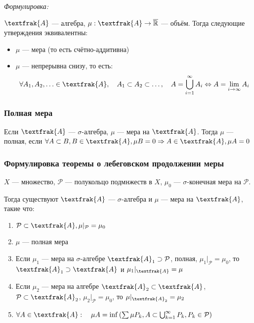 \documentclass{article}
\begin{document}
\textit{Формулировка:}

$\textfrak{A}$ --- алгебра, $\mu: \textfrak{A} \rightarrow \overline{\mathbb{R}}$ --- объём. Тогда следующие утверждения эквивалентны: 

\begin{itemize}
    \item $\mu$ --- мера (то есть счётно-аддитивна)
    \item $\mu$ --- непрерывна снизу, то есть: 
    \[\forall A_1, A_2, \ldots \in \textfrak{A}, \quad A_1 \subset A_2 \subset \ldots, \quad A = \bigcup_{i = 1}^{\infty} A_i \Leftrightarrow A = \lim_{i \rightarrow \infty} A_i\]
\end{itemize}

\subsubsection{Полная мера}

Если $\textfrak{A}$ --- $\sigma$-алгебра, $\mu$ --- мера на $\textfrak{A}$. Тогда $\mu$ --- полная, если $\forall A \subset B, B \in \textfrak{A}, \mu B = 0 \Rightarrow A \in \textfrak{A}, \mu A = 0$


\subsubsection{Формулировка теоремы о лебеговском продолжении меры}

$X$ --- множество, $\mathcal{P}$ --- полукольцо подмнжеств в $X$, $\mu_0$ --- $\sigma$-конечная мера на $\mathcal{P}$.

Тогда существуют $\textfrak{A}$ --- $\sigma$-алгебра и $\mu$ --- мера на $\textfrak{A}$, такие что:

\begin{enumerate}
    \item $\mathcal{P} \subset \textfrak{A}, \mu|_{\mathcal{P}} = \mu_0$
    \item $\mu$ --- полная мера
    \item Если $\mu_1$ --- мера на $\sigma$-алгебре $\textfrak{A}_1 \supset \mathcal{P}$, полная, $\mu_1|_{\mathcal{P}} = \mu_0$, то $\textfrak{A}_1 \supset \textfrak{A}$ и $\mu_1|_{\textfrak{A}} = \mu$
    \item Если $\mu_2$ --- мера на алгебре $\textfrak{A}_2 \subset \textfrak{A}$, $\mathcal{P} \subset \textfrak{A}_2$, $\mu_2|_{\mathcal{P}} = \mu_0$, то $\mu|_{\textfrak{A}_2} = \mu_2$
    \item $\forall A \in \textfrak{A}: \quad \mu A = \inf\left(\sum \mu P_k, A \subset \bigcup_{k = 1}^{\infty} P_k, P_k \in \mathcal{P}\right)$
\end{enumerate}
\end{document}
